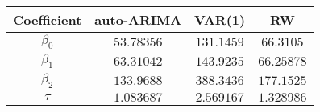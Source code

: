 \begin{tabular}{|c | c c c|} 
    \hline
    Coefficient & auto-ARIMA & VAR(1) & RW \\
    \hline
    $\beta_0$ & $53.78356$ & $131.1459$ & $66.3105$ \\ 
    \hline
    $\beta_1$ & $63.31042$ & $143.9235$ & $66.25878$ \\
    \hline
    $\beta_2$ & $133.9688$ & $388.3436$ & $177.1525$ \\
    \hline
    $\tau$ & $1.083687$ & $2.569167$ & $1.328986$ \\
    \hline
\end{tabular}